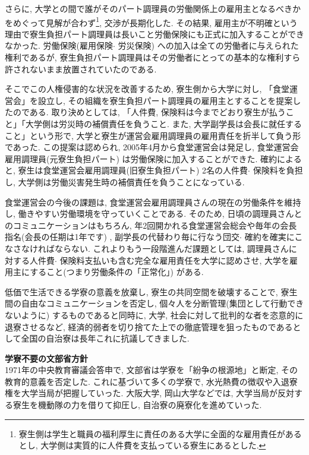 \documentclass[10pt,b5jsbook,dvips,dvipdfmx,openany]{jsbook}
\theoremstyle{definition}
\begin{document}
		さらに, 大学との間で誰がそのパート調理員の労働関係上の雇用主となるべきかをめぐって見解が合わず\footnote{寮生側は学生と職員の福利厚生に責任のある大学に全面的な雇用責任があるとし, 大学側は実質的に人件費を支払っている寮生にあるとした. }, 交渉が長期化した. その結果, 雇用主が不明確という理由で寮生負担パート調理員は長いこと労働保険にも正式に加入することができなかった. 労働保険(雇用保険$ \cdot $ 労災保険) への加入は全ての労働者に与えられた権利であるが, 寮生負担パート調理員はその労働者にとっての基本的な権利すら許されないまま放置されていたのである.

		そこでこの人権侵害的な状況を改善するため, 寮生側から大学に対し, 「食堂運営会」を設立し, その組織を寮生負担パート調理員の雇用主とすることを提案したのである. 取り決めとしては, 「人件費, 保険料は今までどおり寮生が払うこと」「大学側は労災時の補償責任を負うこと. また, 大学副学長は会長に就任すること」という形で, 大学と寮生が運営会雇用調理員の雇用責任を折半して負う形であった. この提案は認められ, 2005年4月から食堂運営会は発足し, 食堂運営会雇用調理員(元寮生負担パート) は労働保険に加入することができた. 確約によると, 寮生は食堂運営会雇用調理員(旧寮生負担パート) 2名の人件費$ \cdot $ 保険料を負担し, 大学側は労働災害発生時の補償責任を負うことになっている.

		食堂運営会の今後の課題は, 食堂運営会雇用調理員さんの現在の労働条件を維持し, 働きやすい労働環境を守っていくことである. そのため, 日頃の調理員さんとのコミュニケーションはもちろん, 年2回開かれる食堂運営会総会や毎年の会長指名(会長の任期は1年です) , 副学長の代替わり毎に行なう団交$ \cdot $ 確約を確実にこなさなければならない. これよりもう一段階進んだ課題としては, 調理員さんに対する人件費$ \cdot $ 保険料支払いも含む完全な雇用責任を大学に認めさせ, 大学を雇用主にすること(つまり労働条件の「正常化」) がある.

		低価で生活できる学寮の意義を放棄し, 寮生の共同空間を破壊することで, 寮生間の自由なコミュニケーションを否定し, 個々人を分断管理(集団として行動できないように) するものであると同時に, 大学, 社会に対して批判的な者を恣意的に退寮させるなど, 経済的弱者を切り捨てた上での徹底管理を狙ったものであるとして全国の自治寮は長年これに抗議してきました.

		\begin{shadebox}
		\textbf{学寮不要の文部省方針} \\
		1971年の中央教育審議会答申で, 文部省は学寮を「紛争の根源地」と断定, その教育的意義を否定した. これに基づいて多くの学寮で, 水光熱費の徴収や入退寮権を大学当局が把握していった. 大阪大学, 岡山大学などでは, 大学当局が反対する寮生を機動隊の力を借りて抑圧し, 自治寮の廃寮化を進めていった.
		\end{shadebox}
\end{document}
